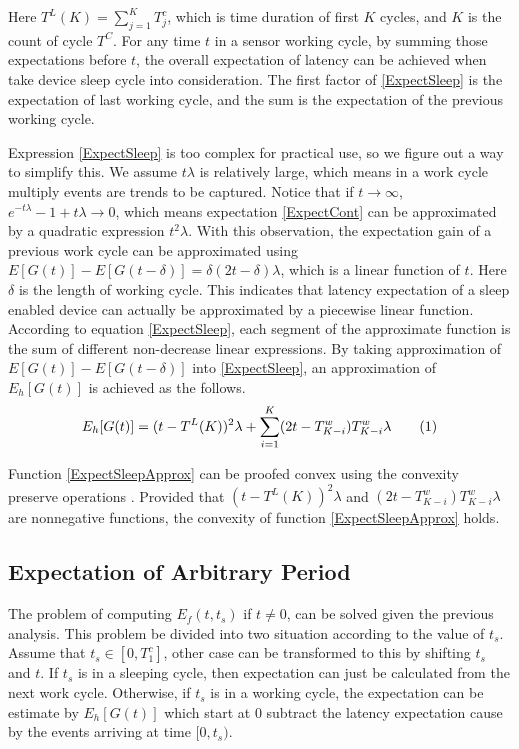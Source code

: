 \documentclass[conference]{IEEEtran}
\newcommand\numberthis{\addtocounter{equation}{1}\tag{\theequation}}
\DeclarePairedDelimiter\floor{\lfloor}{\rfloor}
\begin{document}
Here $T^{L}(K) = \sum_{j=1}^{K} T^{c}_{j}$, which is time duration of first $K$ cycles, and $K$ is the count of cycle $T^{C}$. 
For any time $t$ in a sensor working cycle, by summing those expectations before $t$, the overall expectation of latency can be achieved when take device sleep cycle into consideration. The first factor of \eqref{ExpectSleep} is the expectation of last working cycle, and the sum is the expectation of the previous working cycle.


Expression \eqref{ExpectSleep} is too complex for practical use, so we figure out a way to simplify this. 
We assume $t\lambda$ is relatively large, which means in a work cycle multiply events are trends to be captured.
Notice that if $t\rightarrow \infty$, $e^{-t\lambda}-1+t \lambda \rightarrow 0$, which means expectation \eqref{ExpectCont} can be approximated by a quadratic expression $t^2\lambda$.
With this observation, the expectation gain of a previous work cycle can be approximated using $E[G(t)]-E[G(t-\delta)] = \delta (2 t - \delta)\lambda$, which is a linear function of $t$. Here $\delta$ is the length of working cycle.
This indicates that latency expectation of a sleep enabled device can actually be approximated by a piecewise linear function.
According to equation \eqref{ExpectSleep}, each segment of the approximate function is the sum of different non-decrease linear expressions.
By taking approximation of $E[G(t)]-E[G(t-\delta)]$ into \eqref{ExpectSleep}, an approximation of $E_h[G(t)]$ is achieved as the follows.
\begin{align*}
E_h[G(t)] = (t-T^{L}(K))^2\lambda + \sum_{i=1}^{K} (2 t - T^{w}_{K-i})T^{w}_{K-i}\lambda
\numberthis 
\label{ExpectSleepApprox}
\end{align*}

Function \eqref{ExpectSleepApprox} can be proofed convex using the convexity preserve operations \cite{boyd2004convex}. Provided that $(t-T^{L}(K))^2\lambda$ and $(2 t - T^{w}_{K-i})T^{w}_{K-i}\lambda$ are nonnegative functions, the convexity of function \eqref{ExpectSleepApprox} holds.

\subsection{Expectation of Arbitrary Period}
The problem of computing $E_f(t,t_s)$ if $t\ne0$, can be solved given the previous analysis. This problem be divided into two situation according to the value of $t_s$.
Assume that $t_s\in [0,T^{c}_{1}]$, other case can be transformed to this by shifting $t_s$ and $t$.
If $t_s$ is in a sleeping cycle, then expectation can just be calculated from the next work cycle.
Otherwise, if $t_s$ is in a working cycle, the expectation can be estimate by $E_h[G(t)]$ which start at $0$ subtract the latency expectation cause by the events arriving at time $[0, t_s)$.
\end{document}
